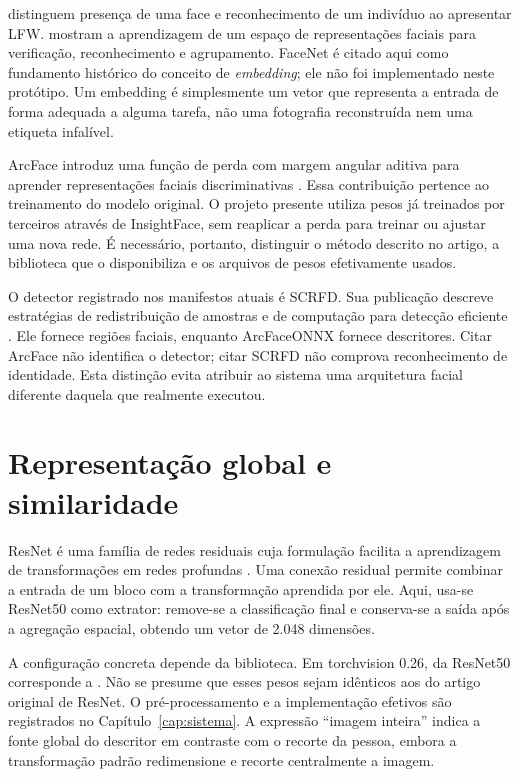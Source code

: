  distinguem presença de uma face e reconhecimento de um indivíduo ao apresentar LFW.  mostram a aprendizagem de um espaço de representações faciais para verificação, reconhecimento e agrupamento. FaceNet é citado aqui como fundamento histórico do conceito de \emph{embedding}; ele não foi implementado neste protótipo. Um embedding é simplesmente um vetor que representa a entrada de forma adequada a alguma tarefa, não uma fotografia reconstruída nem uma etiqueta infalível.

ArcFace introduz uma função de perda com margem angular aditiva para aprender representações faciais discriminativas \cite{Deng2019}. Essa contribuição pertence ao treinamento do modelo original. O projeto presente utiliza pesos já treinados por terceiros através de InsightFace, sem reaplicar a perda para treinar ou ajustar uma nova rede. É necessário, portanto, distinguir o método descrito no artigo, a biblioteca que o disponibiliza e os arquivos de pesos efetivamente usados.

O detector registrado nos manifestos atuais é SCRFD. Sua publicação descreve estratégias de redistribuição de amostras e de computação para detecção eficiente \cite{Guo2021}. Ele fornece regiões faciais, enquanto ArcFaceONNX fornece descritores. Citar ArcFace não identifica o detector; citar SCRFD não comprova reconhecimento de identidade. Esta distinção evita atribuir ao sistema uma arquitetura facial diferente daquela que realmente executou.

\section{Representação global e similaridade}
ResNet é uma família de redes residuais cuja formulação facilita a aprendizagem de transformações em redes profundas \cite{He2016}. Uma conexão residual permite combinar a entrada de um bloco com a transformação aprendida por ele. Aqui, usa-se ResNet50 como extrator: remove-se a classificação final e conserva-se a saída após a agregação espacial, obtendo um vetor de 2.048 dimensões.

A configuração concreta depende da biblioteca. Em torchvision 0.26,  da ResNet50 corresponde a  \cite{Torchvision}. Não se presume que esses pesos sejam idênticos aos do artigo original de ResNet. O pré-processamento e a implementação efetivos são registrados no Capítulo~\ref{cap:sistema}. A expressão ``imagem inteira'' indica a fonte global do descritor em contraste com o recorte da pessoa, embora a transformação padrão redimensione e recorte centralmente a imagem.

